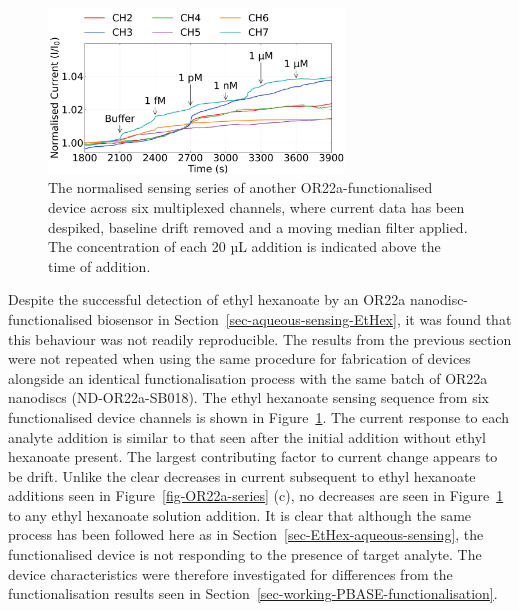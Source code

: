 \documentclass[
  a4paper,
]{scrbook}
\begin{document}
\begin{figure}

{\centering \includegraphics[width=0.7\textwidth,height=\textheight]{figures/ch7/Q4C4_OR22a_Functionalised_filtered_detrend_trunc_arrows_normalised.png}

}

\caption[The normalised sensing series of another OR22a-functionalised
device across six multiplexed channels, where current data has been
despiked, baseline drift removed and a moving median filter
applied.]{\label{fig-OR22a-variability}The normalised sensing series of
another OR22a-functionalised device across six multiplexed channels,
where current data has been despiked, baseline drift removed and a
moving median filter applied. The concentration of each 20 µL addition
is indicated above the time of addition.}

\end{figure}

Despite the successful detection of ethyl hexanoate by an OR22a
nanodisc-functionalised biosensor in
Section~\ref{sec-aqueous-sensing-EtHex}, it was found that this
behaviour was not readily reproducible. The results from the previous
section were not repeated when using the same procedure for fabrication
of devices alongside an identical functionalisation process with the
same batch of OR22a nanodiscs (ND-OR22a-SB018). The ethyl hexanoate
sensing sequence from six functionalised device channels is shown in
Figure~\ref{fig-OR22a-variability}. The current response to each analyte
addition is similar to that seen after the initial addition without
ethyl hexanoate present. The largest contributing factor to current
change appears to be drift. Unlike the clear decreases in current
subsequent to ethyl hexanoate additions seen in
Figure~\ref{fig-OR22a-series} (c), no decreases are seen in
Figure~\ref{fig-OR22a-variability} to any ethyl hexanoate solution
addition. It is clear that although the same process has been followed
here as in Section~\ref{sec-EtHex-aqueous-sensing}, the functionalised
device is not responding to the presence of target analyte. The device
characteristics were therefore investigated for differences from the
functionalisation results seen in
Section~\ref{sec-working-PBASE-functionalisation}.
\end{document}
